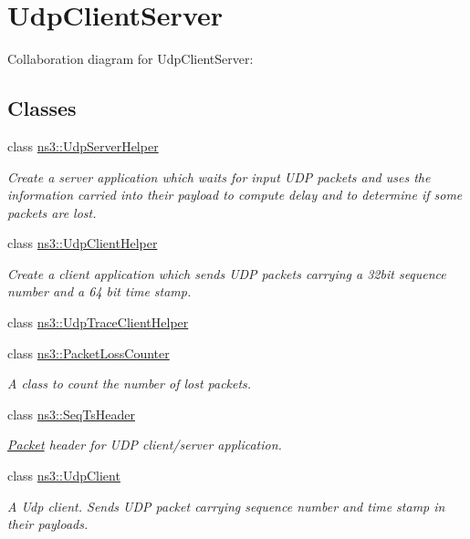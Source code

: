 \hypertarget{group__udpclientserver}{}\section{Udp\+Client\+Server}
\label{group__udpclientserver}
Collaboration diagram for Udp\+Client\+Server\+:
\subsection*{Classes}
\begin{DoxyCompactItemize}
\item 
class \hyperlink{classns3_1_1UdpServerHelper}{ns3\+::\+Udp\+Server\+Helper}
\begin{DoxyCompactList}\small\item\em Create a server application which waits for input U\+DP packets and uses the information carried into their payload to compute delay and to determine if some packets are lost. \end{DoxyCompactList}\item 
class \hyperlink{classns3_1_1UdpClientHelper}{ns3\+::\+Udp\+Client\+Helper}
\begin{DoxyCompactList}\small\item\em Create a client application which sends U\+DP packets carrying a 32bit sequence number and a 64 bit time stamp. \end{DoxyCompactList}\item 
class \hyperlink{classns3_1_1UdpTraceClientHelper}{ns3\+::\+Udp\+Trace\+Client\+Helper}
\item 
class \hyperlink{classns3_1_1PacketLossCounter}{ns3\+::\+Packet\+Loss\+Counter}
\begin{DoxyCompactList}\small\item\em A class to count the number of lost packets. \end{DoxyCompactList}\item 
class \hyperlink{classns3_1_1SeqTsHeader}{ns3\+::\+Seq\+Ts\+Header}
\begin{DoxyCompactList}\small\item\em \hyperlink{classns3_1_1Packet}{Packet} header for U\+DP client/server application. \end{DoxyCompactList}\item 
class \hyperlink{classns3_1_1UdpClient}{ns3\+::\+Udp\+Client}
\begin{DoxyCompactList}\small\item\em A Udp client. Sends U\+DP packet carrying sequence number and time stamp in their payloads. \end{DoxyCompactList}\item 

\end{DoxyCompactItemize}
